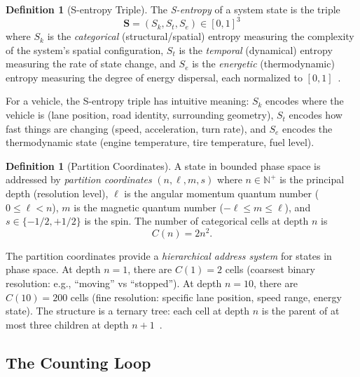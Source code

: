 \documentclass[twocolumn,10pt]{article}
\theoremstyle{definition}
\newtheorem{definition}[theorem]{Definition}
\newcommand{\Sentropy}{\mathbf{S}}
\newcommand{\Sk}{S_k}
\newcommand{\St}{S_t}
\newcommand{\Se}{S_e}
\newcommand{\Cn}{C(n)}
\begin{document}
\begin{definition}[S-entropy Triple]
\label{def:s-entropy}
The \emph{S-entropy} of a system state is the triple
\begin{equation}
\Sentropy = (\Sk, \St, \Se) \in [0,1]^3
\end{equation}
where $\Sk$ is the \emph{categorical} (structural/spatial) entropy measuring the complexity of the system's spatial configuration, $\St$ is the \emph{temporal} (dynamical) entropy measuring the rate of state change, and $\Se$ is the \emph{energetic} (thermodynamic) entropy measuring the degree of energy dispersal, each normalized to $[0,1]$~\cite{sachikonye2026trajectory}.
\end{definition}

For a vehicle, the S-entropy triple has intuitive meaning: $\Sk$ encodes where the vehicle is (lane position, road identity, surrounding geometry), $\St$ encodes how fast things are changing (speed, acceleration, turn rate), and $\Se$ encodes the thermodynamic state (engine temperature, tire temperature, fuel level).

\begin{definition}[Partition Coordinates]
\label{def:partition-coords}
A state in bounded phase space is addressed by \emph{partition coordinates} $(n, \ell, m, s)$ where $n \in \mathbb{N}^+$ is the principal depth (resolution level), $\ell$ is the angular momentum quantum number ($0 \leq \ell < n$), $m$ is the magnetic quantum number ($-\ell \leq m \leq \ell$), and $s \in \{-1/2, +1/2\}$ is the spin. The number of categorical cells at depth $n$ is
\begin{equation}
\Cn = 2n^2.
\label{eq:degeneracy}
\end{equation}
\end{definition}

The partition coordinates provide a \emph{hierarchical address system} for states in phase space. At depth $n=1$, there are $C(1) = 2$ cells (coarsest binary resolution: e.g., ``moving'' vs ``stopped''). At depth $n=10$, there are $C(10) = 200$ cells (fine resolution: specific lane position, speed range, energy state). The structure is a ternary tree: each cell at depth $n$ is the parent of at most three children at depth $n+1$~\cite{sachikonye2026poincare}.

\subsection{The Counting Loop}
\end{document}
